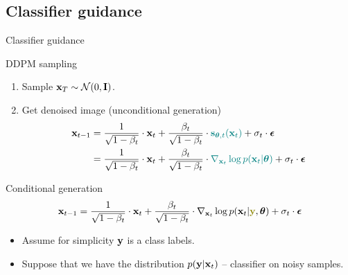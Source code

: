 \subsection{Classifier guidance}
\begin{frame}{Classifier guidance}
	\begin{block}{DDPM sampling}
		\begin{enumerate}
			\item Sample $\mathbf{x}_T \sim \mathcal{N}(0, \mathbf{I})$.
			\item Get denoised image (unconditional generation)
			\vspace{-0.3cm}
			\begin{align*}
				\mathbf{x}_{t - 1} &= \frac{1}{\sqrt{1 - \beta_t}} \cdot \mathbf{x}_t + \frac{\beta_t}{\sqrt{1 - \beta_t}} \cdot {\color{teal}\mathbf{s}_{\boldsymbol{\theta}, t} (\mathbf{x}_t)} +  \sigma_t \cdot \boldsymbol{\epsilon} \\
				& = \frac{1}{\sqrt{1 - \beta_t}} \cdot \mathbf{x}_t + \frac{\beta_t}{\sqrt{1 - \beta_t}} \cdot {\color{teal} \nabla_{\mathbf{x}_t} \log p(\mathbf{x}_t | \boldsymbol{\theta})} +  \sigma_t \cdot \boldsymbol{\epsilon}
			\end{align*}
			\vspace{-0.5cm}
		\end{enumerate}
	\end{block}
	\begin{block}{Conditional generation}
		\vspace{-0.5cm}
		\[
			\bx_{t - 1} = \frac{1}{\sqrt{1 - \beta_t}}\cdot \bx_t +  \frac{\beta_t}{\sqrt{1 - \beta_t}}  \cdot  \nabla_{\bx_t} \log p(\bx_t | {\color{olive}\by}, \btheta) +  \sigma_t \cdot \bepsilon
		\]
		\vspace{-0.5cm}
	\end{block}
	\begin{itemize}
		\item Assume for simplicity $\mathbf{y}$ is a class labels.
		\item Suppose that we have the distribution $p(\mathbf{y} | \mathbf{x}_t)$ -- classifier on noisy samples.
	\end{itemize}
\end{frame}
